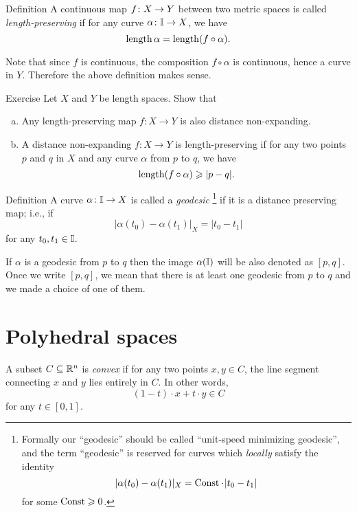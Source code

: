 \begin{thm}{Definition}\label{def:length-preserving}
A continuous map $f\:X\z\to Y$ between two metric spaces
is called \emph{length-preserving} if for any curve $\alpha\colon\mathbb{I}\to X$,
we have 
$$\operatorname{length}\alpha=\operatorname{length}(f\circ\alpha).$$

\end{thm}

Note that since $f$ is continuous, the composition $f\circ\alpha$ is continuous, hence a curve in $Y$. %
Therefore the above definition makes sense.


\begin{thm}{Exercise}\label{LP=>short}
Let $X$ and $Y$ be length spaces.
Show that 

\begin{enumerate}[a)]
\item\label{LP=>short:a} Any length-preserving map $f: X\to Y$
is also distance non-expanding.
\item\label{LP=>short:b} A distance non-expanding $f: X\to Y$ is length-preserving if 
for any two points $p$ and $q$ in $X$
and any curve $\alpha$ from $p$ to $q$, we have 
$$\operatorname{length}(f\circ\alpha)\geqslant |p-q|.$$
\end{enumerate}
\end{thm}

\begin{thm}{Definition}\label{def:geodesic}
 A curve $\alpha\colon\mathbb{I}\to X$ is called a \emph{geodesic}%
\footnote{Formally our ``geodesic'' should be called ``unit-speed minimizing geodesic'',
and the term ``geodesic'' is reserved for curves which \emph{locally} satisfy the identity
$$|\alpha(t_0)-\alpha(t_1)|_X=\Const\cdot|t_0-t_1|$$
for some $\operatorname{Const}\geqslant 0$.}
 if it is a distance preserving map;
i.e., if 
$$|\alpha(t_0)-\alpha(t_1)|_X=|t_0-t_1|$$
for any $t_0,t_1\in\mathbb{I}$.
\end{thm}

If $\alpha$ is a geodesic from $p$ to $q$ then the image $\alpha(\mathbb{I})$
will be also denoted as $[p,q]$.
Once we write $[p,q]$, we mean that there is at least one geodesic from $p$ to $q$ and we made a choice of one of them.

\section*{Polyhedral spaces}

A subset $C \subseteq \mathbb{R}^n$ is \emph{convex} if for any two points $x, y \in C$, the line segment connecting $x$ and $y$ lies entirely in $C$.
In other words,
\[(1-t)\cdot x + t\cdot y\in C\]
for any $t\in[0,1]$.

